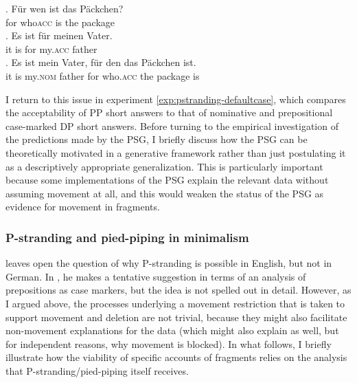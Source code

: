 \exg. Für wen ist das Päckchen?\label{ex:package-cleft}\\ 
      for who\textsc{acc} is the package\\
      \ag. Es ist für meinen Vater.\\
      it is for my.\textsc{acc} father\\
      \bg. Es ist mein Vater, für den das Päckchen ist.\\ 
      it is my.\textsc{nom} father for who.\textsc{acc} the package is\\
      
I return to this issue in experiment \ref{exp:pstranding-defaultcase}, which compares the acceptability of PP short answers to that of nominative and prepositional case-marked DP short answers. Before turning to the empirical investigation of the predictions made by the PSG, I briefly discuss how the PSG can be theoretically motivated in a generative framework rather than just postulating it as a descriptively appropriate generalization. This is particularly important because some implementations of the PSG explain the relevant data without assuming movement at all, and this would weaken the status of the PSG as evidence for movement in fragments.


\subsubsection{P-stranding and pied-piping in minimalism}
\label{sec:pstranding-background-mp}
\citet{merchant2004} leaves open the question of why P-stranding is possible in English, but not in German. In \citet{merchant2001}, he makes a tentative suggestion in terms of an analysis of prepositions as case markers, but the idea is not spelled out in detail. However, as I argued above, the processes underlying a movement restriction that is taken to support movement and deletion are not trivial, because they might also facilitate non-movement explanations for the data (which might also explain as well, but for independent reasons, why movement is blocked). In what follows, I briefly illustrate how the viability of specific accounts of fragments relies on the analysis that P-stranding/pied-piping itself receives.

